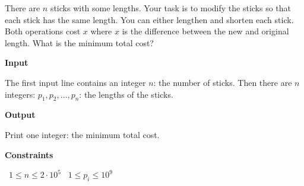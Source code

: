 There are $n$ sticks with some lengths. Your task is to modify the sticks so that each stick has the same length.
You can either lengthen and shorten each stick. Both operations cost $x$ where $x$ is the difference between the new and original length.
What is the minimum total cost?

\vspace{0.3cm}\noindent\textbf{Input}

The first input line contains an integer $n$: the number of sticks.
Then there are $n$ integers: $p_1,p_2,\ldots,p_n$: the lengths of the sticks.

\vspace{0.3cm}\noindent\textbf{Output}

Print one integer: the minimum total cost.

\vspace{0.3cm}\noindent\textbf{Constraints}

\textbullet\ $1 \le n \le 2 \cdot 10^5$
\textbullet\ $1 \le p_i \le 10^9$